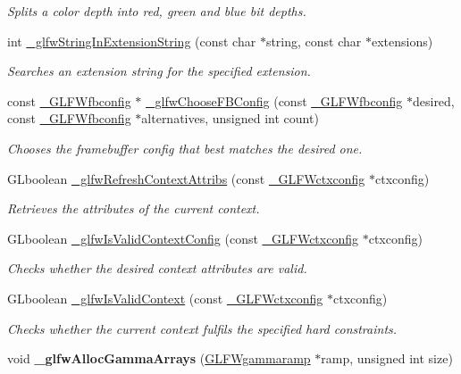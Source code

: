 \begin{DoxyCompactItemize}
\begin{DoxyCompactList}\small\item\em Splits a color depth into red, green and blue bit depths. \end{DoxyCompactList}\item 
int \hyperlink{group__utility_ga7991c5c2c8aa8aa1b1bc334b9bfef628}{\+\_\+glfw\+String\+In\+Extension\+String} (const char $\ast$string, const char $\ast$extensions)
\begin{DoxyCompactList}\small\item\em Searches an extension string for the specified extension. \end{DoxyCompactList}\item 
const \hyperlink{struct__GLFWfbconfig}{\+\_\+\+G\+L\+F\+Wfbconfig} $\ast$ \hyperlink{group__utility_ga276a94e57c3120e6a79651acb1b8f535}{\+\_\+glfw\+Choose\+F\+B\+Config} (const \hyperlink{struct__GLFWfbconfig}{\+\_\+\+G\+L\+F\+Wfbconfig} $\ast$desired, const \hyperlink{struct__GLFWfbconfig}{\+\_\+\+G\+L\+F\+Wfbconfig} $\ast$alternatives, unsigned int count)
\begin{DoxyCompactList}\small\item\em Chooses the framebuffer config that best matches the desired one. \end{DoxyCompactList}\item 
G\+Lboolean \hyperlink{group__utility_gae5f45419810b850c7cf3cfc7398d0779}{\+\_\+glfw\+Refresh\+Context\+Attribs} (const \hyperlink{struct__GLFWctxconfig}{\+\_\+\+G\+L\+F\+Wctxconfig} $\ast$ctxconfig)
\begin{DoxyCompactList}\small\item\em Retrieves the attributes of the current context. \end{DoxyCompactList}\item 
G\+Lboolean \hyperlink{group__utility_gaddac442b1d72d41b952c4549b31255da}{\+\_\+glfw\+Is\+Valid\+Context\+Config} (const \hyperlink{struct__GLFWctxconfig}{\+\_\+\+G\+L\+F\+Wctxconfig} $\ast$ctxconfig)
\begin{DoxyCompactList}\small\item\em Checks whether the desired context attributes are valid. \end{DoxyCompactList}\item 
G\+Lboolean \hyperlink{group__utility_ga5760a2807e46a7523d1f797764f8c394}{\+\_\+glfw\+Is\+Valid\+Context} (const \hyperlink{struct__GLFWctxconfig}{\+\_\+\+G\+L\+F\+Wctxconfig} $\ast$ctxconfig)
\begin{DoxyCompactList}\small\item\em Checks whether the current context fulfils the specified hard constraints. \end{DoxyCompactList}\item 
\hypertarget{group__utility_gacb6a8b432b06fd0accdfc0e046785109}{}void {\bfseries \+\_\+glfw\+Alloc\+Gamma\+Arrays} (\hyperlink{structGLFWgammaramp}{G\+L\+F\+Wgammaramp} $\ast$ramp, unsigned int size)\label{group__utility_gacb6a8b432b06fd0accdfc0e046785109}


\end{DoxyCompactItemize}
